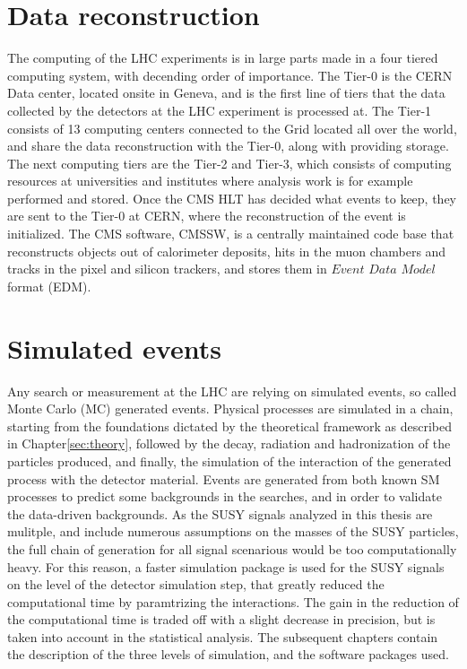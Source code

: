 \section{Data reconstruction}
\noindent
\justify
The computing of the LHC experiments is in large parts made in a four tiered computing system, with decending order of importance. 
The Tier-0 is the CERN Data center, located onsite in Geneva, and is the first line of tiers that the data collected by the detectors at the LHC experiment is processed at. 
The Tier-1 consists of 13 computing centers connected to the Grid located all over the world, and share the data reconstruction with the Tier-0, along with providing storage.
The next computing tiers are the Tier-2 and Tier-3, which consists of computing resources at universities and institutes where analysis work is for example performed and stored. 
Once the CMS HLT has decided what events to keep, they are sent to the Tier-0 at CERN, where the reconstruction of the event is initialized. 
The CMS software, CMSSW, is a centrally maintained code base that reconstructs objects out of calorimeter deposits, hits in the muon chambers and tracks in the pixel and silicon trackers, and stores them in $Event$ $Data$ $Model$ format (EDM).    
\section{Simulated events}\label{sec:MC}
\noindent
\justify
Any search or measurement at the LHC are relying on simulated events, so called Monte Carlo (MC) generated events. 
Physical processes are simulated in a chain, starting from the foundations dictated by the theoretical framework as described in Chapter\ref{sec:theory}, followed by the decay, radiation and hadronization of the particles produced, and finally, the simulation of the interaction of the generated process with the detector material. 
Events are generated from both known SM processes to predict some backgrounds in the searches, and in order to validate the data-driven backgrounds. 
As the SUSY signals analyzed in this thesis are mulitple, and include numerous assumptions on the masses of the SUSY particles, the full chain of generation for all signal scenarious would be too computationally heavy. 
For this reason, a faster simulation package is used for the SUSY signals on the level of the detector simulation step, that greatly reduced the computational time by paramtrizing the interactions. 
The gain in the reduction of the computational time is traded off with a slight decrease in precision, but is taken into account in the statistical analysis. 
The subsequent chapters contain the description of the three levels of simulation, and the software packages used. 
